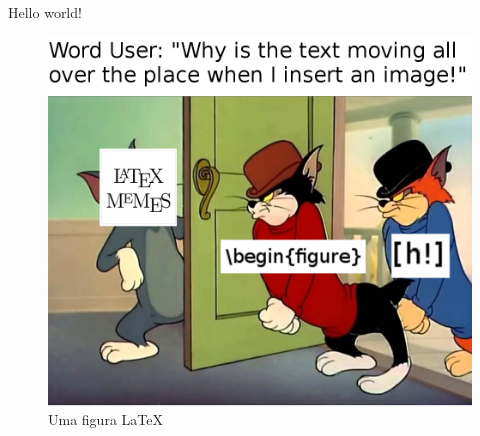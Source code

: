 \documentclass[11pt]{article}
\begin{document}
	Hello world!

	\begin{figure}
		\includegraphics[width=\textwidth]{imagem.png}
		\caption{Uma figura \LaTeX}
	\end{figure}
	
\end{document}
